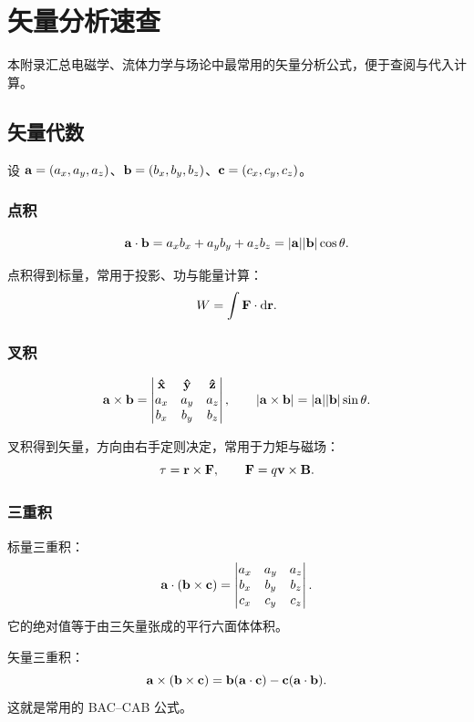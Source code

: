\chapter{矢量分析速查}

本附录汇总电磁学、流体力学与场论中最常用的矢量分析公式，便于查阅与代入计算。

\section{矢量代数}

设 $\vb{a}=(a_x,a_y,a_z)$、$\vb{b}=(b_x,b_y,b_z)$、$\vb{c}=(c_x,c_y,c_z)$。

\subsection{点积}

\[
\vb{a}\cdot\vb{b}=a_x b_x+a_y b_y+a_z b_z=\abs{\vb{a}}\abs{\vb{b}}\cos\theta.
\]

点积得到标量，常用于投影、功与能量计算：
\[
W=\int \vb{F}\cdot \dd \vb{r}.
\]

\subsection{叉积}

\[
\vb{a}\times\vb{b}=
\begin{vmatrix}
\vu{x} & \vu{y} & \vu{z}\\
a_x & a_y & a_z\\
b_x & b_y & b_z
\end{vmatrix},
\qquad
\abs{\vb{a}\times\vb{b}}=\abs{\vb{a}}\abs{\vb{b}}\sin\theta.
\]

叉积得到矢量，方向由右手定则决定，常用于力矩与磁场：
\[
\vb{\tau}=\vb{r}\times\vb{F},
\qquad
\vb{F}=q\vb{v}\times\vb{B}.
\]

\subsection{三重积}

标量三重积：
\[
\vb{a}\cdot(\vb{b}\times\vb{c})=
\begin{vmatrix}
a_x & a_y & a_z\\
b_x & b_y & b_z\\
c_x & c_y & c_z
\end{vmatrix}.
\]
它的绝对值等于由三矢量张成的平行六面体体积。

矢量三重积：
\[
\vb{a}\times(\vb{b}\times\vb{c})=\vb{b}(\vb{a}\cdot\vb{c})-\vb{c}(\vb{a}\cdot\vb{b}).
\]
这就是常用的 BAC--CAB 公式。

